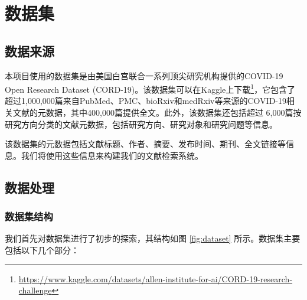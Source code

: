 \documentclass[UTF8,openany]{ctexbook}
\begin{document}
\chapter{数据集}

\section{数据来源}

本项目使用的数据集是由美国白宫联合一系列顶尖研究机构提供的COVID-19 Open Research Dataset (CORD-19)。该数据集可以在Kaggle上下载\footnote{\url{https://www.kaggle.com/datasets/allen-institute-for-ai/CORD-19-research-challenge}}，它包含了超过1,000,000篇来自PubMed、PMC、bioRxiv和medRxiv等来源的COVID-19相关文献的元数据，其中400,000篇提供全文。此外，该数据集还包括超过 6,000篇按研究方向分类的文献元数据，包括研究方向、研究对象和研究问题等信息。

该数据集的元数据包括文献标题、作者、摘要、发布时间、期刊、全文链接等信息。我们将使用这些信息来构建我们的文献检索系统。


\section{数据处理}

\subsection{数据集结构}

我们首先对数据集进行了初步的探索，其结构如图 \ref{fig:dataset} 所示。数据集主要包括以下几个部分：
\end{document}
